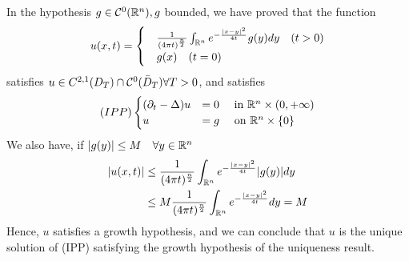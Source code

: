 \begin{remark}
    In the hypothesis $g \in \mathcal{C}^0(\mathbb{R}^n), g$ bounded, we have proved that the function
    \begin{equation*}
    u(x,t) = 
        \begin{cases}
            &\frac{1}{(4 \pi t) ^ \frac{n}{2}} \int_{\mathbb{R}^n} e^{-\frac{|x-y|^2}{4t}} g(y) dy \quad (t > 0)\\
            &g(x) \quad (t= 0)
        \end{cases}
    \end{equation*}
    satisfies $u \in \\{C}^{2,1}(D_T) \cap \mathcal{C}^0(\Bar{D}_T) \forall T > 0$, and satisfies 
    \begin{equation*}
    (IPP)
        \begin{cases}
            (\partial_t - \Delta) u &= 0 \quad \text{ in } \mathbb{R}^n \times (0,+\infty)\\
            u&=g \quad \text{ on } \mathbb{R}^n \times \{0\} 
        \end{cases}
    \end{equation*}
    We also have, if $|g(y)| \leq M \quad \forall y \in \mathbb{R}^n$
    \begin{align*}
        |u(x,t)| &\leq \frac{1}{(4 \pi t)^\frac{n}{2}} \int_{\mathbb{R}^n} e^{-\frac{|x-y|^2}{4t}} |g(y)| dy \\
        & \leq M \frac{1}{(4 \pi t)^\frac{n}{2}} \int_{\mathbb{R}^n} e^{-\frac{|x-y|^2}{4t}} dy = M
    \end{align*}
    Hence, $u$ satisfies a growth hypothesis, and we can conclude that $u$ is the unique solution of (IPP) satisfying the growth hypothesis of the uniqueness result. 
\end{remark}
